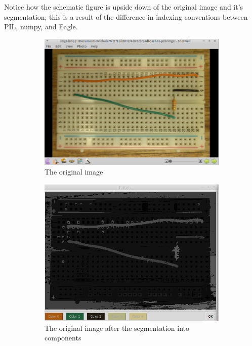 \documentclass[10pt,twocolumn,letterpaper]{article}
\begin{document}
Notice how the schematic figure is upside down of the original image and it's
segmentation; this is a result of the difference in indexing conventions
between PIL, numpy, and Eagle.

\begin{figure}[ht]
\centering
\begin{subfigure}[b]{\linewidth}
	\centering
   \includegraphics[width=0.9\linewidth]{demos/full_pipeline2_original.png}
	\caption{The original image}
	\label{fig:origfull}
\end{subfigure}
\begin{subfigure}[b]{\linewidth}
	\centering
   \includegraphics[width=0.9\linewidth]{demos/full_pipeline2_segmentation.png}
	\caption{The original image after the segmentation into components}
	\label{fig:segfull}
\end{subfigure}
\begin{subfigure}[b]{\linewidth}

\end{subfigure}
\end{figure}
\end{document}
